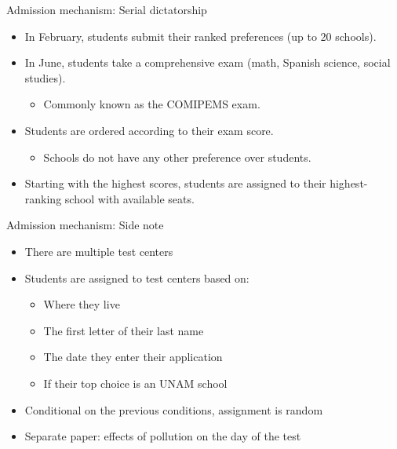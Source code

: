 \documentclass[notes,11pt, aspectratio=169]{beamer}
\begin{document}
\begin{frame}[fragile]{Admission mechanism: Serial dictatorship}
  \begin{itemize}
    \vfill\item In February, students submit their ranked preferences (up to 20 schools).
    \vfill\item In June, students take a comprehensive exam (math, Spanish science, social studies).
    \begin{itemize}
    \vfill\item Commonly known as the COMIPEMS exam.
    \end{itemize}
    \vfill\item Students are ordered according to their exam score.
      \begin{itemize}
    \vfill\item Schools do not have any other preference over students.
    \end{itemize}
    \vfill\item Starting with the highest scores, students are assigned to their highest-ranking school with available seats.
  \end{itemize}
\end{frame}

\begin{frame}[fragile]{Admission mechanism: Side note}
  \begin{itemize}
    \vfill\item There are multiple test centers 
    \vfill\item Students are assigned to test centers based on:
      \begin{itemize}
    \vfill\item Where they live
    \vfill\item The first letter of their last name
    \vfill\item The date they enter their application
    \vfill\item If their top choice is an UNAM school
     \end{itemize}
     \vfill\item Conditional on the previous conditions, assignment is random
     \vfill\item Separate paper: effects of pollution on the day of the test
  \end{itemize}
\end{frame}
\end{document}
